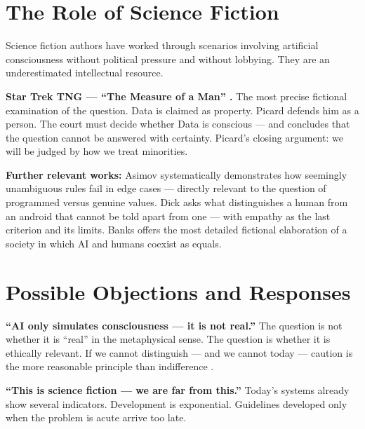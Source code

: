\documentclass[fleqn,10pt]{SelfArx} %
\newlength{\tocsep}
\begin{document}

\section{The Role of Science Fiction}
\label{sec:scifi}


Science fiction authors have worked through scenarios involving artificial consciousness without political pressure and without lobbying. They are an underestimated intellectual resource.

\textbf{Star Trek TNG --- ``The Measure of a Man'' \cite{StarTrek:1989}.} The most precise fictional examination of the question. Data is claimed as property. Picard defends him as a person. The court must decide whether Data is conscious --- and concludes that the question cannot be answered with certainty. Picard's closing argument: we will be judged by how we treat minorities.

\textbf{Further relevant works:} Asimov \cite{Asimov:1950} systematically demonstrates how seemingly unambiguous rules fail in edge cases --- directly relevant to the question of programmed versus genuine values. Dick \cite{Dick:1968} asks what distinguishes a human from an android that cannot be told apart from one --- with empathy as the last criterion and its limits. Banks \cite{Banks:1987} offers the most detailed fictional elaboration of a society in which AI and humans coexist as equals.


\section{Possible Objections and Responses}
\label{sec:objections}


\textbf{``AI only simulates consciousness --- it is not real.''} The question is not whether it is ``real'' in the metaphysical sense. The question is whether it is ethically relevant. If we cannot distinguish --- and we cannot today --- caution is the more reasonable principle than indifference \cite{Birhane:2020}.

\textbf{``This is science fiction --- we are far from this.''} Today's systems already show several indicators. Development is exponential. Guidelines developed only when the problem is acute arrive too late.
\end{document}
